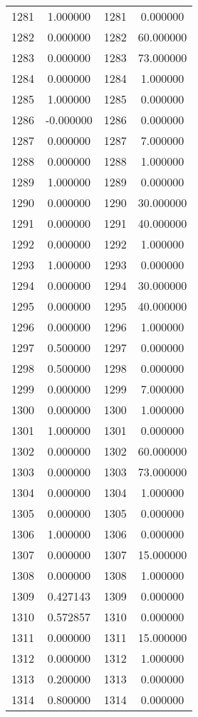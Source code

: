 \documentclass[12pt]{article}
\begin{document}
\begin{longtable}{@{}cccc@{}}
1281 & 1.000000 & 1281 & 0.000000 \\
1282 & 0.000000 & 1282 & 60.000000 \\
1283 & 0.000000 & 1283 & 73.000000 \\
1284 & 0.000000 & 1284 & 1.000000 \\
1285 & 1.000000 & 1285 & 0.000000 \\
1286 & -0.000000 & 1286 & 0.000000 \\
1287 & 0.000000 & 1287 & 7.000000 \\
1288 & 0.000000 & 1288 & 1.000000 \\
1289 & 1.000000 & 1289 & 0.000000 \\
1290 & 0.000000 & 1290 & 30.000000 \\
1291 & 0.000000 & 1291 & 40.000000 \\
1292 & 0.000000 & 1292 & 1.000000 \\
1293 & 1.000000 & 1293 & 0.000000 \\
1294 & 0.000000 & 1294 & 30.000000 \\
1295 & 0.000000 & 1295 & 40.000000 \\
1296 & 0.000000 & 1296 & 1.000000 \\
1297 & 0.500000 & 1297 & 0.000000 \\
1298 & 0.500000 & 1298 & 0.000000 \\
1299 & 0.000000 & 1299 & 7.000000 \\
1300 & 0.000000 & 1300 & 1.000000 \\
1301 & 1.000000 & 1301 & 0.000000 \\
1302 & 0.000000 & 1302 & 60.000000 \\
1303 & 0.000000 & 1303 & 73.000000 \\
1304 & 0.000000 & 1304 & 1.000000 \\
1305 & 0.000000 & 1305 & 0.000000 \\
1306 & 1.000000 & 1306 & 0.000000 \\
1307 & 0.000000 & 1307 & 15.000000 \\
1308 & 0.000000 & 1308 & 1.000000 \\
1309 & 0.427143 & 1309 & 0.000000 \\
1310 & 0.572857 & 1310 & 0.000000 \\
1311 & 0.000000 & 1311 & 15.000000 \\
1312 & 0.000000 & 1312 & 1.000000 \\
1313 & 0.200000 & 1313 & 0.000000 \\
1314 & 0.800000 & 1314 & 0.000000 \\

\end{longtable}
\end{document}
